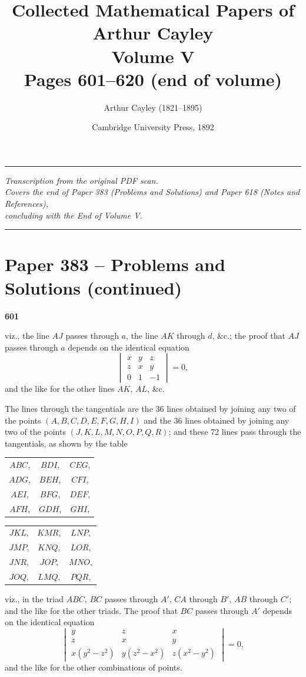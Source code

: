 \documentclass[12pt,a4paper]{article}
\title{\vspace{-1cm}\textbf{Collected Mathematical Papers of Arthur Cayley}\\[4pt]
\Large Volume V\\[4pt]
\large Pages 601--620 (end of volume)}
\author{Arthur Cayley (1821--1895)}
\date{Cambridge University Press, 1892}
\theoremstyle{plain}
\begin{document}
\maketitle
\thispagestyle{empty}

\vspace{0.5cm}
\noindent\rule{\textwidth}{0.4pt}
\begin{center}
\textit{Transcription from the original PDF scan.\\
Covers the end of Paper 383 (Problems and Solutions) and Paper 618 (Notes and References),\\
concluding with the End of Volume V.}
\end{center}
\noindent\rule{\textwidth}{0.4pt}
\vspace{0.5cm}

\section*{Paper 383 -- Problems and Solutions (continued)}

\setcounter{page}{601}
\noindent\textbf{601}

\noindent viz., the line $AJ$ passes through $a$, the line $AK$ through $d$, \&c.; the proof that $AJ$ passes through $a$ depends on the identical equation
\[
\begin{vmatrix}
x & y & z \\
z & x & y \\
0 & 1 & -1
\end{vmatrix} = 0,
\]
and the like for the other lines $AK$, $AL$, \&c.

The lines through the tangentials are the 36 lines obtained by joining any two of the points $(A,B,C,D,E,F,G,H,I)$ and the 36 lines obtained by joining any two of the points $(J,K,L,M,N,O,P,Q,R)$; and these 72 lines pass through the tangentials, as shown by the table
\begin{center}
\begin{tabular}{ccc}
$ABC$,& $BDI$,& $CEG$,\\
$ADG$,& $BEH$,& $CFI$,\\
$AEI$,& $BFG$,& $DEF$,\\
$AFH$,& $GDH$,& $GHI$,
\end{tabular}
\qquad
\begin{tabular}{ccc}
$JKL$,& $KMR$,& $LNP$,\\
$JMP$,& $KNQ$,& $LOR$,\\
$JNR$,& $JOP$,& $MNO$,\\
$JOQ$,& $LMQ$,& $PQR$,
\end{tabular}
\end{center}
viz., in the triad $ABC$, $BC$ passes through $A'$, $CA$ through $B'$, $AB$ through $C'$; and the like for the other triads. The proof that $BC$ passes through $A'$ depends on the identical equation
\[
\begin{vmatrix}
y & z & x \\
z & x & y \\
x(y^2-z^2) & y(z^2-x^2) & z(x^2-y^2)
\end{vmatrix} = 0,
\]
and the like for the other combinations of points.
\end{document}
